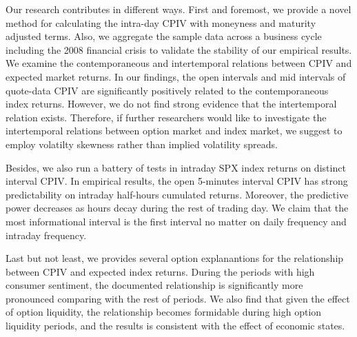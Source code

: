 Our research contributes in different ways. First and foremost, we provide a novel method for calculating the intra-day CPIV with moneyness and maturity adjusted terms. Also, we aggregate the sample data across a business cycle including the 2008 financial crisis to validate the stability of our empirical results. We examine the contemporaneous and intertemporal relations between CPIV and expected market returns. In our findings, the open intervals and mid intervals of quote-data CPIV are significantly positively related to the contemporaneous index returns. However, we do not find strong evidence that the intertemporal relation exists. Therefore, if further researchers would like to investigate the intertemporal relations between option market and index market, we suggest to employ volatilty skewness rather than implied volatility spreads.   

Besides, we also run a battery of tests in intraday SPX index returns on distinct interval CPIV. In empirical results, the open 5-minutes interval CPIV has strong predictability on intraday half-hours cumulated returns. Moreover, the predictive power decreases as hours decay during the rest of trading day. We claim that the most informational interval is the first interval no matter on daily frequency and intraday frequency. 

Last but not least, we provides several option explanantions for the relationship between CPIV and expected index returns. During the periods with high consumer sentiment, the documented relationship is significantly more pronounced comparing with the rest of periods. We also find that given the effect of option liquidity, the relationship becomes formidable during high option liquidity periods, and the results is consistent with the effect of economic states.  